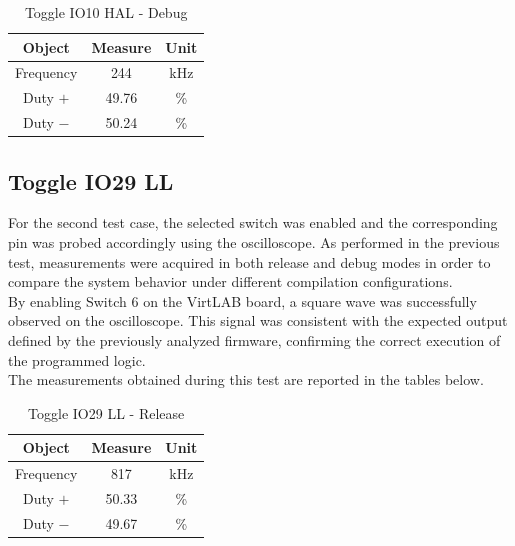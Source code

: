 \documentclass[../main.tex]{subfiles}
\begin{document}
\begin{table}[h]
\centering
\begin{tabular}{ccc}

\textbf{Object} & \textbf{Measure} & \textbf{Unit} \\
\hline
Frequency & 244 &  kHz \\
\hline
Duty $+$ & 49.76  &\% \\
\hline
Duty $-$ & 50.24  & \% \\

\end{tabular}
\caption{Toggle IO10 HAL - Debug}
\label{tab:example}
\end{table}



\subsection{Toggle IO29 LL}

For the second test case, the selected switch was enabled and the corresponding pin was probed accordingly using the oscilloscope. As performed in the previous test, measurements were acquired in both release and debug modes in order to compare the system behavior under different compilation configurations. \\

By enabling Switch 6 on the VirtLAB board, a square wave was successfully observed on the oscilloscope. This signal was consistent with the expected output defined by the previously analyzed firmware, confirming the correct execution of the programmed logic. \\

The measurements obtained during this test are reported in the tables below.\\

\begin{table}[h]
\centering
\begin{tabular}{ccc}

\textbf{Object} & \textbf{Measure} & \textbf{Unit} \\
\hline
Frequency & 817 & kHz \\
\hline
Duty $+$ & 50.33 & \% \\
\hline
Duty $-$ & 49.67 & \% \\

\end{tabular}
\caption{Toggle IO29 LL - Release}
\label{tab:example}
\end{table}
\end{document}
